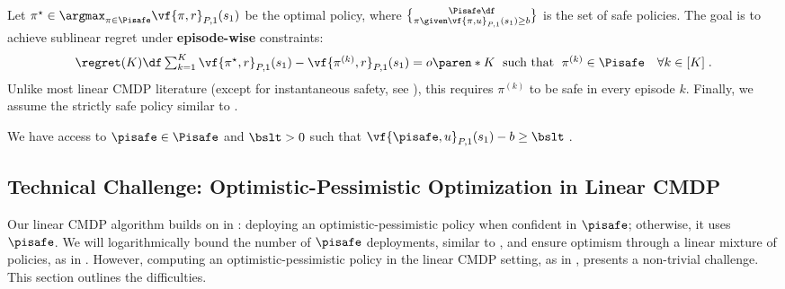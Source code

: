 Let $\pi^\star \in \argmax_{\pi \in \Pisafe} \vf{\pi, r}_{P, 1}(s_1)$ be the optimal policy, where $\Pisafe \df \brace{\pi \given \vf{\pi, u}_{P, 1}(s_1) \geq b}$ is the set of safe policies. The goal is to achieve sublinear regret under \textbf{episode-wise} constraints:
\begin{align}\label{eq:CMDP-goal}
{\textstyle
\regret (K) 
\df 
\sum^K_{k=1} 
\vf{\pi^\star, r}_{P, 1}(s_1) - 
\vf{\pi^{(k)}, r}_{P, 1}(s_1)
= o\paren*{K}
\;\text{ such that }\;
\pi^{(k)} \in \Pisafe \quad \forall k \in [K]\;.
}
\end{align}
Unlike most linear CMDP literature (except for instantaneous safety, see ), this requires $\pi^{(k)}$ to be safe in every episode $k$.
Finally, we assume the strictly safe policy similar to .
\begin{assumption}\label{assumption:slater}
We have access to $\pisafe \in \Pisafe$ and $\bslt > 0$ such that $\vf{\pisafe, u}_{P, 1}(s_1) - b \geq \bslt\;$.
\end{assumption}



\subsection{Technical Challenge: Optimistic-Pessimistic Optimization in Linear CMDP}\label{subsec:technical-challenge-MDP}

Our linear CMDP algorithm builds on \Banditalgo in : deploying an optimistic-pessimistic policy when confident in \(\pisafe\); otherwise, it uses \(\pisafe\). 
We will logarithmically bound the number of \(\pisafe\) deployments, similar to , and ensure optimism through a linear mixture of policies, as in .
However, computing an optimistic-pessimistic policy in the linear CMDP setting, as in \optpes, presents a non-trivial challenge.
This section outlines the difficulties.

